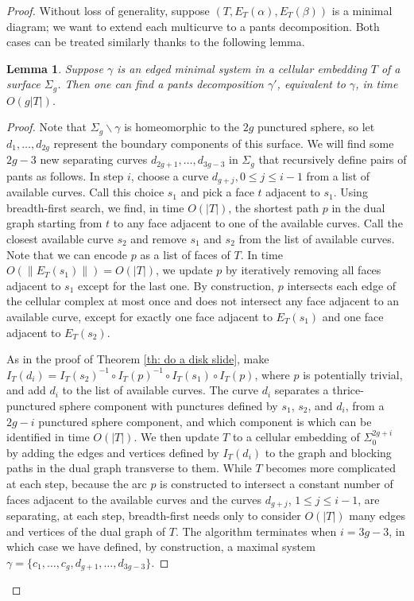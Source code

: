 \documentclass[11pt]{amsart}
\numberwithin{equation}{section}
\theoremstyle{plain}
\newtheorem{lemma}[equation]{Lemma}
\theoremstyle{definition}
\begin{document}
\begin{proof}
    Without loss of generality, suppose $(T,E_T(\alpha),E_T(\beta))$ is a minimal diagram; we want to extend each multicurve to a pants decomposition. 
    Both cases can be treated similarly thanks to the following lemma.

\begin{lemma}\label{lm: get pants}
    Suppose $\gamma$ is an edged minimal system in a cellular embedding $T$ of a surface $\Sigma_g$. Then one can find a pants decomposition $\gamma'$, equivalent to $\gamma$, in time $O(g|T|)$.
\end{lemma}
\begin{proof}
    Note that $\Sigma_g\backslash \gamma$ is homeomorphic to the $2g$ punctured sphere, so let $d_1,\dots,d_{2g}$ represent the boundary components of this surface.
    We will find some $2g-3$ new separating curves $d_{2g+1},\dots, d_{3g-3}$ in $\Sigma_g$ that recursively define pairs of pants as follows.
    In step $i$, choose a curve $d_{g+j}, 0\leq j\leq i-1$ from a list of available curves. 
    Call this choice $s_1$ and pick a face $t$ adjacent to $s_1$. 
    Using breadth-first search, we find, in time $O(|T|)$, the shortest path $p$ in the dual graph starting from $t$ to any face adjacent to one of the available curves.
    Call the closest available curve $s_2$ and remove $s_1$ and $s_2$ from the list of available curves. 
    Note that we can encode $p$ as a list of faces of $T$.
    In time $O(\|E_T(s_1)\|)=O(|T|)$, we update $p$ by iteratively removing all faces adjacent to $s_1$ except for the last one.
    By construction, $p$ intersects each edge of the cellular complex at most once and does not intersect any face adjacent to an available curve, except for exactly one face adjacent to $E_T({s_1})$ and one face adjacent to $E_T({s_2})$.
    
    As in the proof of Theorem \ref{th: do a disk slide}, make $I_T(d_i)=I_T(s_2)^{-1}\circ I_T(p)^{-1}\circ I_T(s_1)\circ I_T(p)$, where $p$ is potentially trivial, and add $d_i$ to the list of available curves. 
    The curve $d_i$ separates a thrice-punctured sphere component with punctures defined by $s_1$, $s_2$, and $d_i$, from a $2g-i$ punctured sphere component, and which component is which can be identified in time $O(|T|)$.
    We then update $T$ to a cellular embedding of $\Sigma_0^{2g+i}$ by adding the edges and vertices defined by $I_T(d_i)$ to the graph and blocking paths in the dual graph transverse to them.
    While $T$ becomes more complicated at each step, because the arc $p$ is constructed to intersect a constant number of faces adjacent to the available curves and the curves $d_{g+j}$, $1\leq j\leq i-1$, are separating, at each step, breadth-first needs only to consider $O(|T|)$ many edges and vertices of the dual graph of $T$. 
    The algorithm terminates when $i=3g-3$, in which case we have defined, by construction, a maximal system $\gamma = \{c_1,\dots,c_g,d_{g+1},\dots,d_{3g-3}\}$.
\end{proof}


\end{proof}
\end{document}
